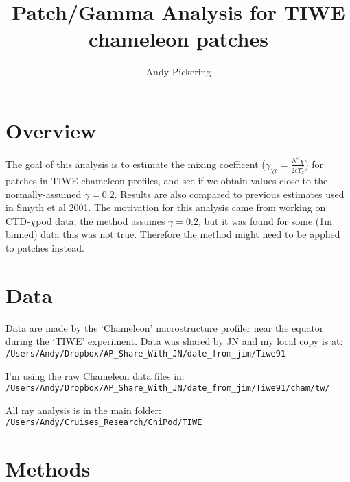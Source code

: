 \documentclass[11pt]{article}
\title{Patch/Gamma Analysis for TIWE chameleon patches}
\author{Andy Pickering}
\begin{document}
\maketitle

\tableofcontents
\newpage

\section{Overview}

The goal of this analysis is to estimate the mixing coefficent ($\gamma_{\chi\epsilon}=\frac{N^2 \chi}{2\epsilon T_{z}^{2}} $) for patches in TIWE chameleon profiles, and see if we obtain values close to the normally-assumed $\gamma=0.2$. Results are also compared to previous estimates used in Smyth et al 2001. The motivation for this analysis came from working on CTD-$\chi$pod data; the method assumes $\gamma=0.2$, but it was found for some (1m binned) data this was not true. Therefore the method might need to be applied to patches instead.

\section{Data}

Data are made by the `Chameleon' microstructure profiler near the equator during the `TIWE' experiment. Data was shared by JN and my local copy is at: \newline \verb+/Users/Andy/Dropbox/AP_Share_With_JN/date_from_jim/Tiwe91+

\medskip

I'm using the raw Chameleon data files in: \newline
\verb+/Users/Andy/Dropbox/AP_Share_With_JN/date_from_jim/Tiwe91/cham/tw/+

\medskip

All my analysis is in the main folder: \newline  \verb+/Users/Andy/Cruises_Research/ChiPod/TIWE+


\section{Methods}
\end{document}
